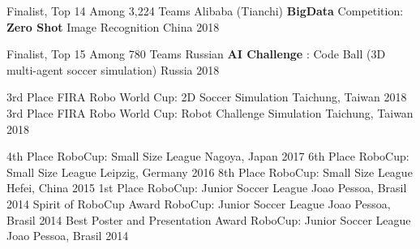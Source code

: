 



\begin{cvhonors}

  \cvhonor
    {Finalist, Top 14 Among 3,224 Teams} %
    {Alibaba (Tianchi) \textbf{BigData} Competition: \textbf{Zero Shot} Image Recognition} %
    {China} %
    {2018} %

  \cvhonor
    {Finalist, Top 15 Among 780 Teams} %
    {Russian \textbf{AI Challenge} : Code Ball (3D multi-agent soccer simulation)} %
    {Russia} %
    {2018} %

  \cvhonor
    {3rd Place} %
    {FIRA Robo World Cup: 2D Soccer Simulation} %
    {Taichung, Taiwan} %
    {2018} %
  \cvhonor
    {3rd Place} %
    {FIRA Robo World Cup: Robot Challenge Simulation} %
    {Taichung, Taiwan} %
    {2018} %
    
  \cvhonor
    {4th Place} %
    {RoboCup: Small Size League} %
    {Nagoya, Japan} %
    {2017} %
  \cvhonor
    {6th Place} %
    {RoboCup: Small Size League} %
    {Leipzig, Germany} %
    {2016} %
  \cvhonor
    {8th Place} %
    {RoboCup: Small Size League} %
    {Hefei, China} %
    {2015} %
  \cvhonor
    {1st Place} %
    {RoboCup: Junior Soccer League} %
    {Joao Pessoa, Brasil} %
    {2014} %
  \cvhonor
    {Spirit of RoboCup Award} %
    {RoboCup: Junior Soccer League} %
    {Joao Pessoa, Brasil} %
    {2014} %
  \cvhonor
    {Best Poster and Presentation Award} %
    {RoboCup: Junior Soccer League} %
    {Joao Pessoa, Brasil} %
    {2014} %
\end{cvhonors}


